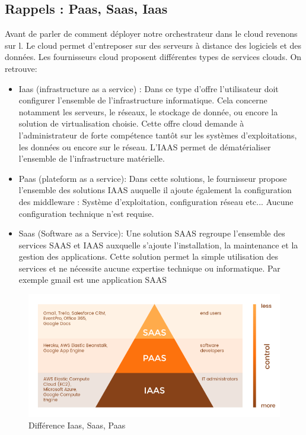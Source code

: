 \documentclass[11pt,fleqn]{book} %
\begin{document}
\subsection{Rappels : Paas, Saas, Iaas}
Avant de parler de comment déployer notre orchestrateur dans le cloud revenons sur l. Le cloud permet d’entreposer sur des serveurs à distance des logiciels et des données. Les fournisseurs cloud proposent différentes types de services clouds. On retrouve:
\begin{itemize}
    \item Iaas (infrastructure as a service) : Dans ce type d'offre l'utilisateur doit configurer l'ensemble de l'infrastructure informatique. Cela concerne notamment les serveurs, le réseaux, le stockage de donnée, ou encore la solution de virtualisation choisie. Cette offre cloud demande à l'administrateur de forte compétence tantôt sur les systèmes d'exploitations, les données ou encore sur le réseau. L'IAAS permet de dématérialiser l'ensemble de l'infrastructure matérielle.
    \item Paas (plateform as a service): Dans cette solutions, le fournisseur propose l'ensemble des solutions IAAS auquelle il ajoute également la configuration des middleware : Système d'exploitation, configuration réseau etc... Aucune configuration technique n'est requise.
    \item Saas (Software as a Service): Une solution SAAS regroupe l'ensemble des services SAAS et IAAS auxquelle s'ajoute l'installation, la maintenance et la gestion des applications. Cette solution permet la simple utilisation des services et ne nécessite aucune expertise technique ou informatique. Par exemple gmail est une application SAAS
\end{itemize}


\begin{figure}[H]\centering
\renewcommand{\figurename}{Graphique}
\includegraphics[scale=0.6]{Pictures/Comparaison/cloud/difference-cloud.png}
\captionsetup{margin=1.5cm,format=hang,justification=justified}
\caption[]{Différence Iaas, Saas, Paas \newline}
\end{figure}
\end{document}

